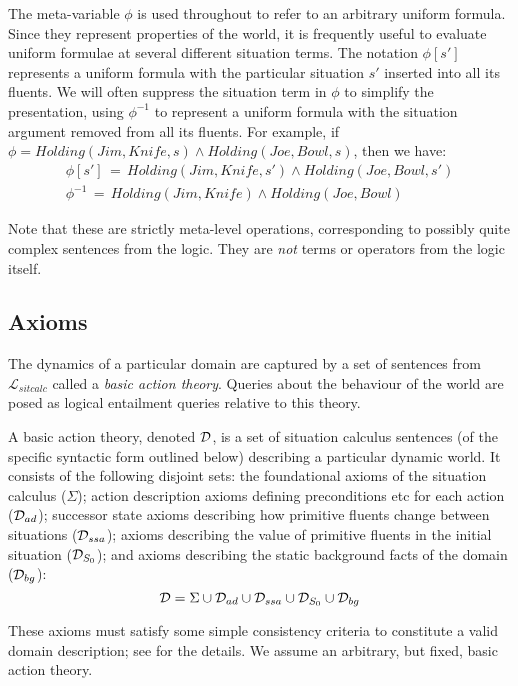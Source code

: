 The meta-variable $\phi$ is used throughout to refer to an arbitrary
uniform formula. Since they represent properties of the world, it
is frequently useful to evaluate uniform formulae at several different
situation terms. The notation $\phi[s']$ represents a uniform formula
with the particular situation $s'$ inserted into all its fluents.
We will often suppress the situation term in $\phi$ to simplify the
presentation, using $\phi^{-1}$ to represent a uniform formula with
the situation argument removed from all its fluents. For example,
if $\phi=Holding(Jim,Knife,s)\wedge Holding(Joe,Bowl,s)$, then we
have:\begin{gather*}
\phi[s']\,=\, Holding(Jim,Knife,s')\wedge Holding(Joe,Bowl,s')\\
\phi^{-1}\,=\, Holding(Jim,Knife)\wedge Holding(Joe,Bowl)\end{gather*}


Note that these are strictly meta-level operations, corresponding
to possibly quite complex sentences from the logic. They are \emph{not}
terms or operators from the logic itself.


\subsection{Axioms\label{sec:Background:SC:Axioms}}

The dynamics of a particular domain are captured by a set of sentences
from $\mathcal{L}_{sitcalc}$ called a \emph{basic action theory}.
Queries about the behaviour of the world are posed as logical entailment
queries relative to this theory.

\begin{defnL}
 A basic action theory, denoted
$\mathcal{D}$, is a set of situation calculus sentences (of the specific
syntactic form outlined below) describing a particular dynamic world.
It consists of the following disjoint sets: the foundational axioms
of the situation calculus ($\Sigma$); action description axioms defining
preconditions etc for each action ($\mathcal{D}_{ad}$); successor state axioms
describing how primitive fluents change between situations ($\mathcal{D}_{ssa}$);
axioms describing the value of primitive fluents in the initial situation
($\mathcal{D}_{S_{0}}$); and axioms describing the static background facts
of the domain ($\mathcal{D}_{bg}$):\[
\mathcal{D}=\Sigma\cup\mathcal{D}_{ad}\cup\mathcal{D}_{ssa}\cup\mathcal{D}_{S_{0}}\cup\mathcal{D}_{bg}\]

\end{defnL}
These axioms must satisfy some simple consistency criteria to constitute
a valid domain description; see \citep{pirri99contributions_sitcalc}
for the details. We assume an arbitrary, but fixed, basic action theory.


